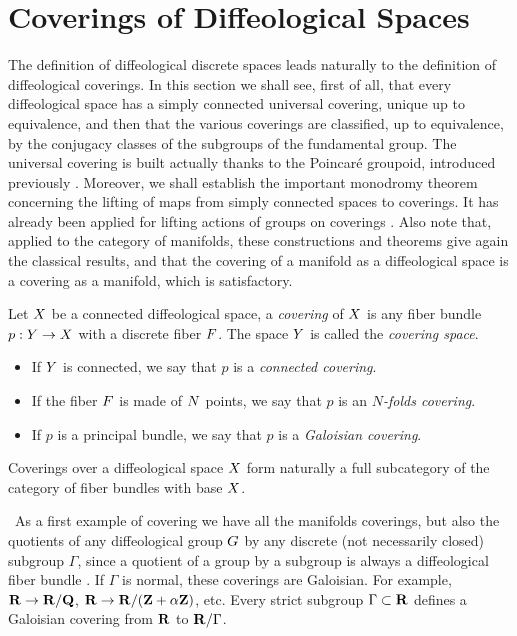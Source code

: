 \section*{Coverings of Diffeological Spaces}
\label{Coverings-of-diffeological-spaces}

\begin{sechead}
  The definition of diffeological discrete spaces  leads naturally to the definition of diffeological coverings.
  In this section we shall see,
  first of all,
  that every diffeological space has a simply connected universal covering,
  unique up to equivalence,
  and then that the various coverings are classified,
  up to equivalence,
  by the conjugacy classes of the subgroups of the fundamental group.
  The universal covering is built actually thanks to the Poincar{\'e} groupoid,
  introduced previously .
  Moreover,
  we shall establish the important monodromy theorem concerning the lifting of maps from simply connected spaces to coverings.
  It has already been applied for lifting actions of groups on coverings .
  Also note that,
  applied to the category of manifolds,
  these constructions and theorems give again the classical results,
  and that the covering of a manifold as a diffeological space is a covering as a manifold, which is satisfactory.
\end{sechead}

\begin{article}
  \label{What-is-a-covering}
  Let $X$ be a connected diffeological space,
  a {\em covering} of $X$ is any fiber bundle $p : Y \to X$ with a discrete fiber $F$.
  The space $Y$ is called the {\em covering space}.
  \begin{itemize}
    \item[1.] If $Y$ is connected,
    we say that $p$ is a {\em connected covering}.
    \item[2.] If the fiber $F$ is made of $N$ points,
    we say that $p$ is an {\em $N$-folds covering}.
    \item[3.] If $p$ is a principal bundle,
    we say that $p$ is a {\em  Galoisian covering}.
  \end{itemize}
  Coverings over a diffeological space $X$ form naturally a full subcategory of the category of fiber bundles  with base $X$.
  
  \Note~As a first example of covering we have all the manifolds coverings,
  but also the quotients of any diffeological group $G$ by any discrete (not necessarily closed) subgroup $\Gamma$,
  since a quotient of a group by a subgroup is always a diffeological fiber bundle .
  If $\Gamma$ is normal,
  these coverings are Galoisian.
  For example,
  ${\mathbf R} \to {\mathbf R}/{\mathbf Q}$,
  ${\mathbf R} \to {\mathbf R}/({\mathbf Z} + \alpha {\mathbf Z})$,
  etc.
  Every strict subgroup $\Gamma \subset {\mathbf R}$ defines a Galoisian covering from ${\mathbf R}$ to ${\mathbf R}/\Gamma$.
\end{article} %

